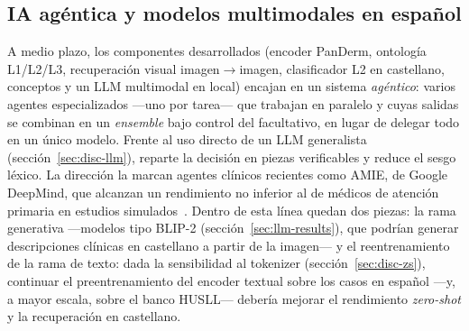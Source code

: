 \subsection{IA agéntica y modelos multimodales en español}
\label{sec:linea-agentica}
A medio plazo, los componentes desarrollados (encoder PanDerm, ontología
L1/L2/L3, recuperación visual imagen$\to$imagen, clasificador L2 en
castellano, conceptos y un LLM multimodal en local) encajan en un sistema
\emph{agéntico}: varios agentes especializados ---uno por tarea--- que
trabajan en paralelo y cuyas salidas se combinan en un \emph{ensemble} bajo
control del facultativo, en lugar de delegar todo en un único modelo.
Frente al uso directo de un LLM generalista (sección~\ref{sec:disc-llm}),
reparte la decisión en piezas verificables y reduce el sesgo léxico. La
dirección la marcan agentes clínicos recientes como AMIE, de Google
DeepMind, que alcanzan un rendimiento no inferior al de médicos de atención
primaria en estudios simulados~\cite{deepmind_aicoclinician,amie2026}.
Dentro de esta línea quedan dos piezas: la rama generativa ---modelos tipo
BLIP-2 (sección~\ref{sec:llm-results}), que podrían generar descripciones
clínicas en castellano a partir de la imagen--- y el reentrenamiento de la
rama de texto: dada la sensibilidad al tokenizer
(sección~\ref{sec:disc-zs}), continuar el preentrenamiento del encoder
textual sobre los casos en español ---y, a mayor escala, sobre el banco
HUSLL--- debería mejorar el rendimiento \emph{zero-shot} y la recuperación
en castellano.

